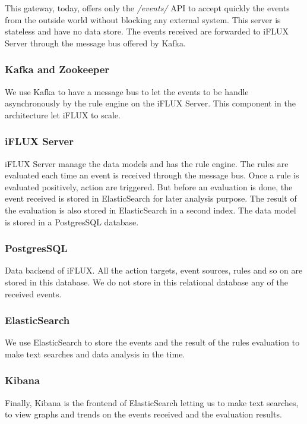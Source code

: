 This gateway, today, offers only the \emph{/events/} API to accept quickly the events from the outside world without blocking any external system. This server is stateless and have no data store. The events received are forwarded to iFLUX Server through the message bus offered by Kafka.

\subsubsection{Kafka and Zookeeper}

We use Kafka to have a message bus to let the events to be handle asynchronously by the rule engine on the iFLUX Server. This component in the architecture let iFLUX to scale.

\subsubsection{iFLUX Server}

iFLUX Server manage the data models and has the rule engine. The rules are evaluated each time an event is received through the message bus. Once a rule is evaluated positively, action are triggered. But before an evaluation is done, the event received is stored in ElasticSearch for later analysis purpose. The result of the evaluation is also stored in ElasticSearch in a second index. The data model is stored in a PostgresSQL database.

\subsubsection{PostgresSQL}

Data backend of iFLUX. All the action targets, event sources, rules and so on are stored in this database. We do not store in this relational database any of the received events.

\subsubsection{ElasticSearch}

We use ElasticSearch to store the events and the result of the rules evaluation to make text searches and data analysis in the time. 

\subsubsection{Kibana}

Finally, Kibana is the frontend of ElasticSearch letting us to make text searches, to view graphs and trends on the events received and the evaluation results.

